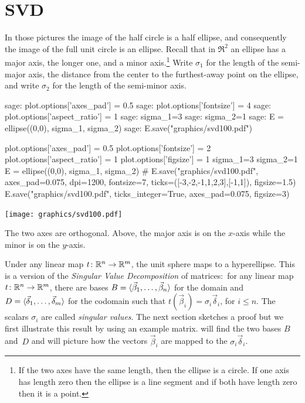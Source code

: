 \section{SVD}
In those pictures the image of the half circle is a half ellipse, and
consequently the image of the full unit circle is an ellipse.
Recall that in $\Re^2$ an ellipse has a major axis, 
the longer one, and a minor axis.\footnote{%
  If the two axes have the same length, 
  then the ellipse is a circle.
  If one axis has length zero then the ellipse is a line segment 
  and if both have length zero then it is a point.}
Write $\sigma_1$ for the length of the semi-major axis, 
the distance from the center to the furthest-away point on the ellipse,
and write $\sigma_2$ for the length of the semi-minor axis.
\begin{sagecommandline}
sage: plot.options['axes_pad'] = 0.5
sage: plot.options['fontsize'] = 4
sage: plot.options['aspect_ratio'] = 1
sage: sigma_1=3
sage: sigma_2=1
sage: E = ellipse((0,0), sigma_1, sigma_2)
sage: E.save("graphics/svd100.pdf")
\end{sagecommandline}
\begin{sagesilent}
plot.options['axes_pad'] = 0.5
plot.options['fontsize'] = 2
plot.options['aspect_ratio'] = 1
plot.options['figsize'] = 1
sigma_1=3
sigma_2=1
E = ellipse((0,0), sigma_1, sigma_2)
# E.save("graphics/svd100.pdf", axes_pad=0.075, dpi=1200, fontsize=7, ticks=([-3,-2,-1,1,2,3],[-1,1]), figsize=1.5)
E.save("graphics/svd100.pdf", ticks_integer=True, axes_pad=0.075, figsize=3)
\end{sagesilent}
\begin{center}
  \texttt{[image: graphics/svd100.pdf]}
\end{center}
The two axes are orthogonal.
Above, the major axis is on the $x$-axis while the
minor is on the $y$-axis.

Under any linear map $\mbox{$t\colon \mathbb{R}^n\to \mathbb{R}^m$}$, the 
unit sphere maps to a hyperellipse.
This is a version of the \textit{Singular Value Decomposition} of
matrices:~for
any linear map $\mbox{$t\colon \mathbb{R}^n\to \mathbb{R}^m$}$, there are bases
$B=\langle\vec{\beta}_1,\ldots,\vec{\beta}_n\rangle$ for the domain and
$D=\langle\vec{\delta}_1,\ldots,\vec{\delta}_m\rangle$ for the codomain
such that $t(\vec{\beta}_i)=\sigma_i\vec{\delta}_i$, for $i\leq n$.
The scalars $\sigma_i$ are called \textit{singular values}.
The next section sketches a proof
but we first illustrate this result by using an example matrix.
\Sage{} will find the two bases $B$ and~$D$ and will picture how the 
vectors $\vec{\beta}_i$ 
are mapped to the $\sigma_i\vec{\delta}_i$.

